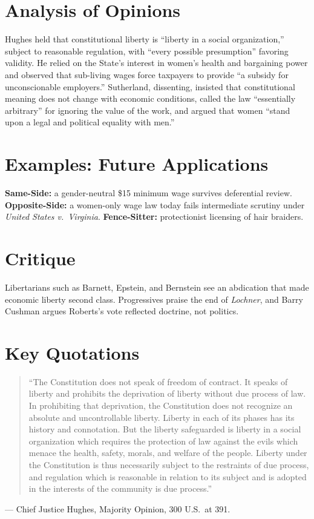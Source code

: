 \documentclass[12pt]{article}
\begin{document}
\section{Analysis of Opinions}
Hughes held that constitutional liberty is ``liberty in a social organization,'' subject to reasonable regulation, with ``every possible presumption'' favoring validity. He relied on the State's interest in women's health and bargaining power and observed that sub-living wages force taxpayers to provide ``a subsidy for unconscionable employers.'' Sutherland, dissenting, insisted that constitutional meaning does not change with economic conditions, called the law ``essentially arbitrary'' for ignoring the value of the work, and argued that women ``stand upon a legal and political equality with men.''

\section{Examples: Future Applications}
\textbf{Same-Side:} a gender-neutral \$15 minimum wage survives deferential review. \textbf{Opposite-Side:} a women-only wage law today fails intermediate scrutiny under \textit{United States v.\ Virginia}. \textbf{Fence-Sitter:} protectionist licensing of hair braiders.

\section{Critique}
Libertarians such as Barnett, Epstein, and Bernstein see an abdication that made economic liberty second class. Progressives praise the end of \textit{Lochner}, and Barry Cushman argues Roberts's vote reflected doctrine, not politics.

\section{Key Quotations}
\begin{quote}
``The Constitution does not speak of freedom of contract. It speaks of liberty and prohibits the deprivation of liberty without due process of law. In prohibiting that deprivation, the Constitution does not recognize an absolute and uncontrollable liberty. Liberty in each of its phases has its history and connotation. But the liberty safeguarded is liberty in a social organization which requires the protection of law against the evils which menace the health, safety, morals, and welfare of the people. Liberty under the Constitution is thus necessarily subject to the restraints of due process, and regulation which is reasonable in relation to its subject and is adopted in the interests of the community is due process.''
\end{quote}
\noindent --- Chief Justice Hughes, Majority Opinion, 300 U.S.\ at 391.
\end{document}
